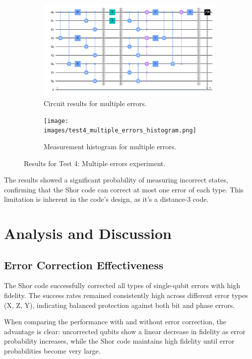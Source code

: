 \documentclass[12pt,a4paper]{article}
\begin{document}
\begin{figure}[H]
    \centering
    \begin{subfigure}[b]{0.49\textwidth}
        \includegraphics[width=\textwidth]{images/test4_multiple_errors.png}
        \caption{Circuit results for multiple errors.}
    \end{subfigure}
    \hfill
    \begin{subfigure}[b]{0.49\textwidth}
        \texttt{[image: images/test4\_multiple\_errors\_histogram.png]}
        \caption{Measurement histogram for multiple errors.}
    \end{subfigure}
    \caption{Results for Test 4: Multiple errors experiment.}
    \label{fig:multiple_errors_results}
\end{figure}

The results showed a significant probability of measuring incorrect states, confirming that the Shor code can correct at most one error of each type. This limitation is inherent in the code's design, as it's a distance-3 code.

\section{Analysis and Discussion}

\subsection{Error Correction Effectiveness}

The Shor code successfully corrected all types of single-qubit errors with high fidelity. The success rates remained consistently high across different error types (X, Z, Y), indicating balanced protection against both bit and phase errors.

When comparing the performance with and without error correction, the advantage is clear: uncorrected qubits show a linear decrease in fidelity as error probability increases, while the Shor code maintains high fidelity until error probabilities become very large.
\end{document}
